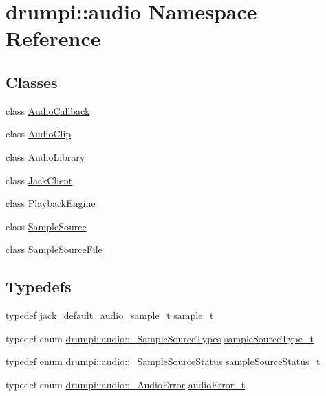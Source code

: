 \hypertarget{namespacedrumpi_1_1audio}{}\section{drumpi\+:\+:audio Namespace Reference}
\label{namespacedrumpi_1_1audio}
\subsection*{Classes}
\begin{DoxyCompactItemize}
\item 
class \hyperlink{classdrumpi_1_1audio_1_1AudioCallback}{Audio\+Callback}
\item 
class \hyperlink{classdrumpi_1_1audio_1_1AudioClip}{Audio\+Clip}
\item 
class \hyperlink{classdrumpi_1_1audio_1_1AudioLibrary}{Audio\+Library}
\item 
class \hyperlink{classdrumpi_1_1audio_1_1JackClient}{Jack\+Client}
\item 
class \hyperlink{classdrumpi_1_1audio_1_1PlaybackEngine}{Playback\+Engine}
\item 
class \hyperlink{classdrumpi_1_1audio_1_1SampleSource}{Sample\+Source}
\item 
class \hyperlink{classdrumpi_1_1audio_1_1SampleSourceFile}{Sample\+Source\+File}
\end{DoxyCompactItemize}
\subsection*{Typedefs}
\begin{DoxyCompactItemize}
\item 
typedef jack\+\_\+default\+\_\+audio\+\_\+sample\+\_\+t \hyperlink{namespacedrumpi_1_1audio_aca0bdc9164f87b72057e284442abab6e}{sample\+\_\+t}
\item 
typedef enum \hyperlink{namespacedrumpi_1_1audio_a64dba7645afe63b0d4a44ef3daa16a8b}{drumpi\+::audio\+::\+\_\+\+Sample\+Source\+Types} \hyperlink{namespacedrumpi_1_1audio_a997f55e8a5b5348cf74dbedb7abe8a59}{sample\+Source\+Type\+\_\+t}
\item 
typedef enum \hyperlink{namespacedrumpi_1_1audio_a015d8de4ce400e4c660b0a0173c98234}{drumpi\+::audio\+::\+\_\+\+Sample\+Source\+Status} \hyperlink{namespacedrumpi_1_1audio_a51bdf5757f414341f104d45e75e2bf63}{sample\+Source\+Status\+\_\+t}
\item 
typedef enum \hyperlink{namespacedrumpi_1_1audio_af36111ce9632c39e5acb2c811f228e2f}{drumpi\+::audio\+::\+\_\+\+Audio\+Error} \hyperlink{namespacedrumpi_1_1audio_ac19e3be3b59052606a02605a7ee26f05}{audio\+Error\+\_\+t}
\end{DoxyCompactItemize}
